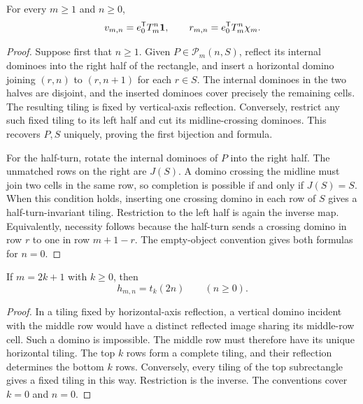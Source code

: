 \begin{lemma}\label{lem:half}
For every $m\ge1$ and $n\ge0$,
\begin{equation}\label{eq:half-fixed}
 v_{m,n}=e_0^{\mathsf T}T_m^n\boldsymbol{1},\qquad
 r_{m,n}=e_0^{\mathsf T}T_m^n\chi_m.
\end{equation}
\end{lemma}
\begin{proof}
Suppose first that $n\ge1$. Given $P\in\mathcal P_m(n,S)$,
reflect its internal dominoes into the right half of the
rectangle, and insert a horizontal domino joining $(r,n)$
to $(r,n+1)$ for each $r\in S$.
The internal dominoes in the two halves are disjoint, and the
inserted dominoes cover precisely the remaining cells.
The resulting tiling is fixed by vertical-axis reflection.
Conversely, restrict any such fixed tiling to its left half
and cut its midline-crossing dominoes. This recovers $P,S$
uniquely, proving the first bijection and formula.

For the half-turn, rotate the internal dominoes of $P$ into
the right half. The unmatched rows on the right are $J(S)$.
A domino crossing the midline must join two cells in the same
row, so completion is possible if and only if $J(S)=S$.
When this condition holds, inserting one crossing domino in
each row of $S$ gives a half-turn-invariant tiling.
Restriction to the left half is again the inverse map.
Equivalently, necessity follows because the half-turn sends a
crossing domino in row $r$ to one in row $m+1-r$.
The empty-object convention gives both formulas for $n=0$.
\end{proof}

\begin{lemma}\label{lem:h-odd}
If $m=2k+1$ with $k\ge0$, then
\begin{equation}\label{eq:h-odd}
 h_{m,n}=t_k(2n)\qquad(n\ge0).
\end{equation}
\end{lemma}
\begin{proof}
In a tiling fixed by horizontal-axis reflection, a vertical
domino incident with the middle row would have a distinct
reflected image sharing its middle-row cell. Such a domino
is impossible.
The middle row must therefore have its unique horizontal
tiling. The top $k$ rows form a complete tiling, and their
reflection determines the bottom $k$ rows.
Conversely, every tiling of the top subrectangle gives a fixed
tiling in this way. Restriction is the inverse.
The conventions cover $k=0$ and $n=0$.
\end{proof}

